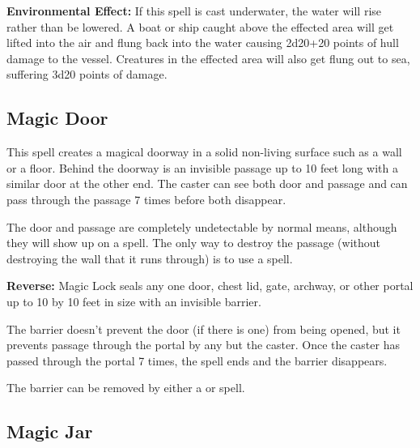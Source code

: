 \begin{multicols*}{2}
\textbf{Environmental Effect:} If this spell is cast underwater, the water will rise rather than be lowered. A boat or ship caught above the effected area will get lifted into the air and flung back into the water causing 2d20+20 points of hull damage to the vessel. Creatures in the effected area will also get flung out to sea, suffering 3d20 points of damage.

\subsection{Magic Door}\label{spell:Magic Door}

This spell creates a magical doorway in a solid non-living surface such as a wall or a floor. Behind the doorway is an invisible passage up to 10 feet long with a similar door at the other end. The caster can see both door and passage and can pass through the passage 7 times before both disappear.

The door and passage are completely undetectable by normal means, although they will show up on a  spell. The only way to destroy the passage (without destroying the wall that it runs through) is to use a  spell.

\textbf{Reverse:} \hypertarget{spell:Magic Lock}{Magic Lock} seals any one door, chest lid, gate, archway, or other portal up to 10 by 10 feet in size with an invisible barrier.

The barrier doesn’t prevent the door (if there is one) from being opened, but it prevents passage through the portal by any but the caster. Once the caster has passed through the portal 7 times, the spell ends and the barrier disappears.

The barrier can be removed by either a  or  spell.

\subsection{Magic Jar}\label{spell:Magic Jar}
\end{multicols*}
